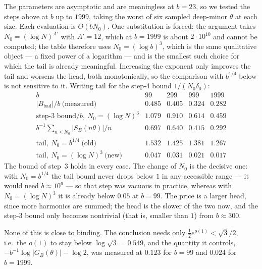 \begin{remark}\label{rem:budget}
The parameters are asymptotic and are meaningless at $b=23$, so we tested the
steps above at $b$ up to $1999$, taking the worst of six sampled deep-minor
$\theta$ at each size. Each evaluation is $O(bN_0)$. One substitution is forced:
the argument takes $N_0=(\log N)^{A'}$ with $A'=12$, which at $b=1999$ is about
$2\cdot10^{10}$ and cannot be computed; the table therefore uses
$N_0=(\log b)^{3}$, which is the same qualitative object --- a fixed power of a
logarithm --- and is the smallest such choice for which the tail is already
meaningful. Increasing the exponent only improves the tail and worsens the head,
both monotonically, so the comparison with $b^{1/4}$ below is not sensitive to
it. Writing $\mathrm{tail}$ for the step-4 bound $1/(N_0\delta_0)$:
\[
  \begin{array}{l|cccc}
    b & 99 & 299 & 999 & 1999\\\hline
    |B_{\mathrm{bad}}|/b\ \text{(measured)} & 0.485 & 0.405 & 0.324 & 0.282\\
    \text{step-3 bound}/b,\ N_0=(\log N)^{3} & 1.079 & 0.910 & 0.614 & 0.459\\
    b^{-1}\sum_{n\le N_0}|S_B(n\theta)|/n & 0.697 & 0.640 & 0.415 & 0.292\\\hline
    \mathrm{tail},\ N_0=b^{1/4}\ \text{(old)} & 1.532 & 1.425 & 1.381 & 1.267\\
    \mathrm{tail},\ N_0=(\log N)^{3}\ \text{(new)} & 0.047 & 0.031 & 0.021 & 0.017
  \end{array}
\]
The bound of step~3 holds in every case. The change of $N_0$ is the decisive
one: with $N_0=b^{1/4}$ the tail bound never drops below $1$ in any accessible
range --- it would need $b\approx10^{6}$ --- so that step was vacuous in
practice, whereas with $N_0=(\log N)^{3}$ it is already below $0.05$ at $b=99$.
The price is a larger head, since more harmonics are summed; the head is the
slower of the two now, and the step-3 bound only becomes nontrivial (that is,
smaller than $1$) from $b\approx300$.

None of this is close to binding. The conclusion needs only
$\tfrac12e^{o(1)}<\sqrt3/2$, i.e.\ the $o(1)$ to stay below
$\log\sqrt3=0.549$, and the quantity it controls,
$-b^{-1}\log|G_B(\theta)|-\log2$, was measured at $0.123$ for $b=99$ and $0.024$
for $b=1999$.
\end{remark}

